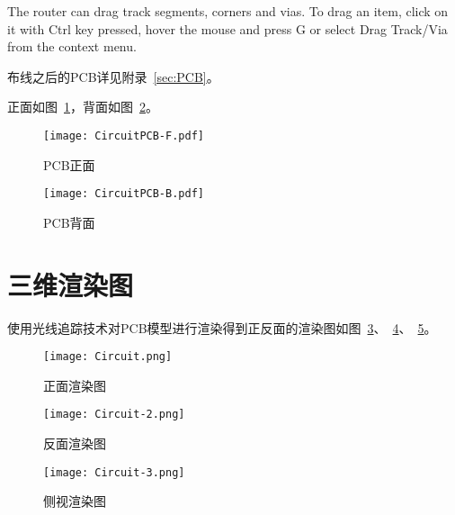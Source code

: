 The router can drag track segments, corners and vias. To drag an item, click on it with Ctrl key pressed, hover the mouse and press G or select Drag Track/Via from the context menu.

布线之后的PCB详见附录~\ref{sec:PCB}。

正面如图~\ref{fig:CircuitPCB-F}，背面如图~\ref{fig:CircuitPCB-B}。

\begin{figure}[htbp]
    \centering
    \texttt{[image: CircuitPCB-F.pdf]}
    \caption{PCB正面}
    \label{fig:CircuitPCB-F}
\end{figure}

\begin{figure}[htbp]
    \centering
    \texttt{[image: CircuitPCB-B.pdf]}
    \caption{PCB背面}
    \label{fig:CircuitPCB-B}
\end{figure}

\section{三维渲染图}

使用光线追踪技术对PCB模型进行渲染得到正反面的渲染图如图~\ref{fig:Circuit-Render}、~\ref{fig:Circuit-Render-2}、~\ref{fig:Circuit-Render-3}。

\begin{figure}[htbp]
    \centering
    \texttt{[image: Circuit.png]}
    \caption{正面渲染图}
    \label{fig:Circuit-Render}
\end{figure}

\begin{figure}[htbp]
    \centering
    \texttt{[image: Circuit-2.png]}
    \caption{反面渲染图}
    \label{fig:Circuit-Render-2}
\end{figure}

\begin{figure}[htbp]
    \centering
    \texttt{[image: Circuit-3.png]}
    \caption{侧视渲染图}
    \label{fig:Circuit-Render-3}
\end{figure}
